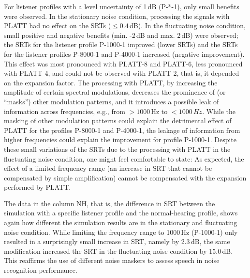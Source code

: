 \documentclass[10pt,a4paper,twocolumn]{article}
\begin{document}
For listener profiles with a level uncertainty of 1\,dB (P-*-1), only small benefits were observed.
%
In the stationary noise condition, processing the signals with PLATT had no effect on the SRTs ($\leq0.4$\,dB).
%
In the fluctuating noise condition, small positive and negative benefits (min. -2\,dB and max. 2\,dB) were observed; the SRTs for the listener profile P-1000-1 improved (lower SRTs) and the SRTs for the listener profiles P-8000-1 and P-4000-1 increased (negative improvement).
%
This effect was most pronounced with PLATT-8 and PLATT-6, less pronounced with PLATT-4, and could not be observed with PLATT-2, that is, it depended on the expansion factor.
%
The processing with PLATT, by increasing the amplitude of certain spectral modulations, decreases the prominence of (or \enquote{masks}) other modulation patterns, and it introduces a possible leak of information across frequencies, e.g., from $>1000$\,Hz to $<1000\,Hz$.
%
While the masking of other modulation patterns could explain the detrimental effect of PLATT for the profiles P-8000-1 and P-4000-1, the leakage of information from higher frequencies could explain the improvement for profile P-1000-1.
%
Despite these small variations of the SRTs due to the processing with PLATT in the fluctuating noise condition, one might feel comfortable to state:
%
As expected, the effect of a limited frequency range (an increase in SRT that cannot be compensated by simple amplification) cannot be compensated with the expansion performed by PLATT.

The data in the column NH, that is, the difference in SRT between the simulation with a specific listener profile and the normal-hearing profile, shows again how different the simulation results are in the stationary and fluctuating noise condition.
%
While limiting the frequency range to 1000\,Hz (P-1000-1) only resulted in a surprisingly small increase in SRT, namely by 2.3\,dB, the same modification increased the SRT in the fluctuating noise condition by 15.0\,dB.
%
This reaffirms the use of different noise maskers to assess speech in noise recognition performance.
\end{document}
